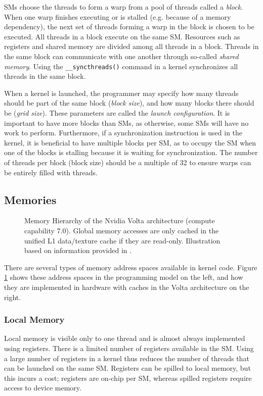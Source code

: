 SMs choose the threads to form a warp from a pool of threads called a \emph{block}. When one warp finishes executing or is stalled (e.g. because of a memory dependency), the next set of threads forming a warp in the block is chosen to be executed. All threads in a block execute on the same SM. Resources such as registers and shared memory are divided among all threads in a block. Threads in the same block can communicate with one another through so-called \emph{shared memory}. Using the \texttt{\_\_syncthreads()} command in a kernel synchronizes all threads in the same block.

When a kernel is launched, the programmer may specify how many threads should be part of the same block (\emph{block size}), and how many blocks there should be (\emph{grid size}). These parameters are called the \emph{launch configuration}. It is important to have more blocks than SMs, as otherwise, some SMs will have no work to perform. Furthermore, if a synchronization instruction is used in the kernel, it is beneficial to have multiple blocks per SM, as to occupy the SM when one of the blocks is stalling because it is waiting for synchronization. The number of threads per block (block size) should be a multiple of 32 to ensure warps can be entirely filled with threads. \cite[Section~10]{cuda-best-practices}

\subsection{Memories} \label{sec:memories}

\begin{figure}
    \makebox[\textwidth]{
    }
    \caption{\label{fig:memory-hierarchy} Memory Hierarchy of the Nvidia Volta architecture (compute capability 7.0). Global memory accesses are only cached in the unified L1 data/texture cache if they are read-only. Illustration based on information provided in \cite[Sections 2.3, 5.3.2, H.6]{cuda-programming}.}
\end{figure}

There are several types of memory address spaces available in kernel code. Figure \ref{fig:memory-hierarchy} shows these address spaces in the programming model on the left, and how they are implemented in hardware with caches in the Volta architecture on the right. 

\subsubsection{Local Memory}
Local memory is visible only to one thread and is almost always implemented using registers. There is a limited number of registers available in the SM. Using a large number of registers in a kernel thus reduces the number of threads that can be launched on the same SM. Registers can be spilled to local memory, but this incurs a cost; registers are on-chip per SM, whereas spilled registers require access to device memory.

